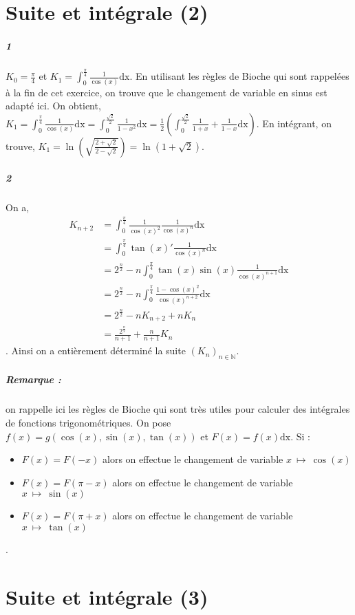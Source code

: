 \documentclass[10pt,a4paper]{article}
\begin{document}
\section{Suite et intégrale (2)}
\subparagraph{1}$K_0 = \frac{\pi}{4}$ et $K_1= \int_0^{\frac{\pi}{4}} \frac{1}{\cos(x)} \text{dx}$. En utilisant les règles de Bioche qui sont rappelées à la fin de cet exercice, on trouve que le changement de variable en sinus est adapté ici. On obtient, $K_1= \int_0^{\frac{\pi}{4}} \frac{1}{\cos(x)} \text{dx} = \int_0^{\frac{\sqrt{2}}{2}} \frac{1}{1-x^2} \text{dx} = \frac{1}{2} \left( \int_0^{\frac{\sqrt{2}}{2}} \frac{1}{1+x} + \frac{1}{1-x} \text{dx} \right)$. En intégrant, on trouve, $K_1 = \ln \left( \sqrt{\frac{2+ \sqrt{2}}{2 - \sqrt{2}}}\right)= \ln(1 + \sqrt{2})$.

\subparagraph{2} On a,
\begin{equation}
\begin{aligned}
K_{n+2} &= \int_0^{\frac{\pi}{4}} \frac{1}{\cos(x)^2} \frac{1}{\cos(x)^n} \text{dx} \\
&= \int_0^{\frac{\pi}{4}} \tan(x)' \frac{1}{\cos(x)^n} \text{dx} \\
&= 2^{\frac{n}{2}} - n \int_0^{\frac{\pi}{4}} \tan(x) \sin(x) \frac{1}{\cos(x)^{n+1}} \text{dx} \\
&= 2^{\frac{n}{2}} - n \int_0^{\frac{\pi}{4}} \frac{1-\cos(x)^2}{\cos(x)^{n+2}} \text{dx} \\
&=2^{\frac{n}{2}} - n K_{n+2} +nK_n \\
&=\frac{2^{\frac{n}{2}}}{n+1} + \frac{n}{n+1} K_n
\end{aligned}
\end{equation}.
Ainsi on a entièrement déterminé la suite $(K_n)_{n \in \mathbb{N}}$.

\subparagraph{Remarque :} on rappelle ici les règles de Bioche qui sont très utiles pour calculer des intégrales de fonctions trigonométriques.
On pose $f(x) = g(\cos(x), \sin(x), \tan(x))$ et $F(x) = f(x) \text{dx}$. Si :
\begin{itemize}
\item $F(x) = F(-x)$ alors on effectue le changement de variable $x \ \mapsto \ \cos(x)$
\item $F(x) = F(\pi-x)$ alors on effectue le changement de variable $x \ \mapsto \ \sin(x)$
\item $F(x) = F(\pi+x)$ alors on effectue le changement de variable $x \ \mapsto \ \tan(x)$
\end{itemize}.
\section{Suite et intégrale (3)}
\end{document}
